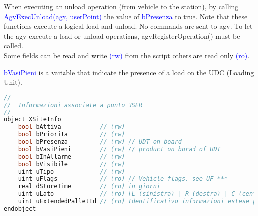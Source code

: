 When executing an unload operation (from vehicle to the station), by calling \textcolor{blue}{AgvExecUnload(agv, userPoint)} the value of \textcolor{blue}{bPresenza} to true. Note that these functions execute a logical load and unload. No commands are sent to agv. To let the agv execute a load or unload operations, agvRegisterOperation() must be called. \\

Some fields can be read and write \textcolor{blue}{(rw)} from the script others are read only \textcolor{blue}{(ro)}.

\textcolor{blue}{bVasiPieni} is a variable that indicate the presence of a load on the UDC (Loading Unit).

\begin{lstlisting}[language=c++, caption= XSiteInfo, label=lstXSiteInfo]
//
//	Informazioni associate a punto USER
//
object XSiteInfo
	bool bAttiva           // (rw)
	bool bPriorita         // (rw)
	bool bPresenza         // (rw) // UDT on board
	bool bVasiPieni        // (rw) // product on borad of UDT
	bool bInAllarme        // (rw)
	bool bVisibile         // (rw)
	uint uTipo             // (rw)
	uint uFlags            // (ro) // Vehicle flags. see UF_***
	real dStoreTime        // (ro) in giorni
	uint uLato             // (ro) [L (sinistra) | R (destra) | C (centro)]
	uint uExtendedPalletId // (ro) Identificativo informazioni estese pallet (se presenti)	
endobject
\end{lstlisting}

